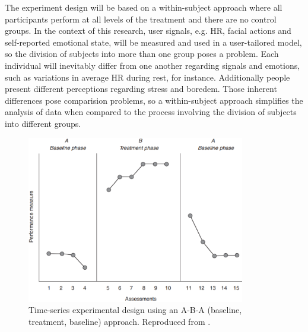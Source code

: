 The experiment design will be based on a within-subject approach \parencite{lane2015online} where all participants perform at all levels of the treatment and there are no control groups. In the context of this research, user signals, e.g. HR, facial actions and self-reported emotional state, will be measured and used in a user-tailored model, so the division of subjects into more than one group poses a problem. Each individual will inevitably differ from one another regarding signals and emotions, such as variations in average HR during rest, for instance. Additionally people present different perceptions regarding stress and boredem. Those inherent differences pose comparision problems, so a within-subject approach simplifies the analysis of data when compared to the process involving the division of subjects into different groups.

\begin{figure}[ht]
    \centering
    \includegraphics[width=0.85\textwidth]{figures/time-series-design-breakwell.png}
    \caption{Time-series experimental design using an A-B-A (baseline, treatment, baseline) approach. Reproduced from \textcite{breakwell1994research}.}
    \label{fig:time-series-design-breakwell}
\end{figure}

